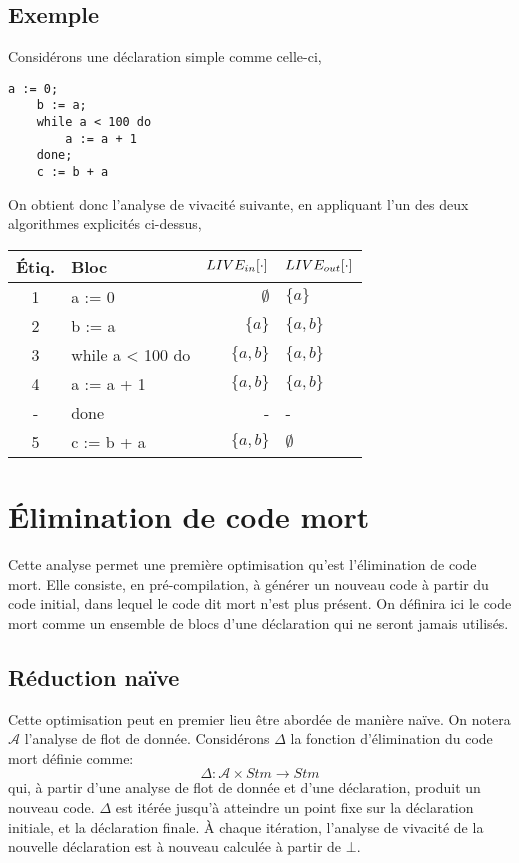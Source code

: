 \documentclass[a4paper, 12pt]{article}
\begin{document}
\subsection{Exemple}
\noindent
Considérons une déclaration simple comme celle-ci,
\begin{lstlisting}[tabsize=2]
	a := 0;
	b := a;
	while a < 100 do
		a := a + 1
	done;
	c := b + a
\end{lstlisting}
On obtient donc l'analyse de vivacité suivante, en appliquant l'un des deux algorithmes explicités ci-dessus,
\\
\begin{center}
	\begin{tabular}{||c|l|r|l||}
	\hline
	Étiq. & Bloc & $LIVE_{in}[\cdot]$ & $LIVE_{out}[\cdot]$ \\
	\hline
	1 & a := 0 & $\emptyset$ & $\{a\}$\\
	2 & b := a & $\{a\}$ & $\{a, b\}$\\
	3 & while a < 100 do & $\{a, b\}$ & $\{a, b\}$\\
	4 & a := a + 1 & $\{a, b\}$ & $\{a, b\}$\\
	- & done & - & -\\
	5 & c := b + a & $\{a, b\}$ & $\emptyset$\\
	\hline
	\end{tabular}
\end{center}
\section{Élimination de code mort}
Cette analyse permet une première optimisation qu'est l'élimination de code mort. Elle consiste, en pré-compilation,
à générer un nouveau code à partir du code initial, dans lequel le code dit mort n'est plus présent.
On définira ici le code mort comme un ensemble de blocs d'une déclaration qui ne seront jamais utilisés.

\subsection{Réduction naïve}
Cette optimisation peut en premier lieu être abordée de manière naïve. On notera $\mathcal{A}$ l'analyse de flot de donnée.
Considérons $\Delta$ la fonction d'élimination du code mort définie comme:
\[\Delta : \mathcal{A} \times Stm \longrightarrow Stm\]
qui, à partir d'une analyse de flot de donnée et d'une déclaration, produit un nouveau code. $\Delta$ est itérée
jusqu'à atteindre un point fixe sur la déclaration initiale, et la déclaration finale. À chaque itération,
l'analyse de vivacité de la nouvelle déclaration est à nouveau calculée à partir de $\bot$.
\end{document}
